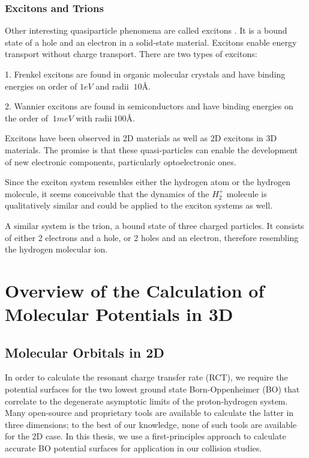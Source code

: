 \subsection*{Excitons and Trions}
Other interesting quasiparticle phenomena are called excitons \cite{Excitons2D1}. It is a bound state of a hole and an electron in a solid-state material. Excitons enable energy transport without charge transport. There are two types of excitons: 

1. Frenkel excitons are found in organic molecular crystals\cite{Excitons3} and have binding energies on
order of $ 1eV $ and radii $ ~ 10\text{\AA} $.  


2. Wannier excitons are found in semiconductors\cite{Excitons2} and have binding energies on the order of $ ~1 meV $ with radii$ ~100\text{\AA}. $


Excitons have been observed in 2D materials\cite{Excitons2D2} as
well as 2D excitons in 3D materials. The promise is that these quasi-particles can enable the development of new electronic components, particularly optoelectronic ones.

Since the exciton system resembles either the hydrogen atom or the hydrogen molecule, it seems conceivable that the dynamics of the $ H_2^{+} $ molecule is qualitatively similar and could be applied to the exciton systems as well.

A similar system is the trion, a bound state of three charged particles. It consists of either 2 electrons and a hole, or 2 holes and an electron, therefore resembling the hydrogen molecular ion. 


\chapter{Overview of the Calculation of Molecular Potentials in 3D}

\section{Molecular Orbitals in 2D}
In order to calculate the resonant charge transfer rate (RCT), we require the potential surfaces for the two lowest ground state Born-Oppenheimer (BO) that correlate to the degenerate asymptotic
limits of the proton-hydrogen system. Many open-source and proprietary tools are available to calculate the latter in three dimensions; to the best of our knowledge, none of such tools are available for the 2D case. In this thesis, we use a first-principles approach to calculate accurate BO potential surfaces for application in our collision studies.

